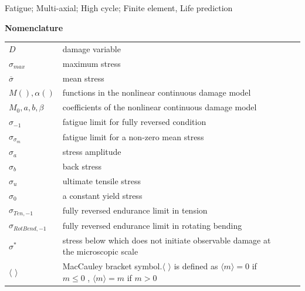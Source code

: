\documentclass[3p,times,procedia,number]{elsarticle}
\begin{document}
\begin{frontmatter}
\begin{keyword}
Fatigue; Multi-axial; High cycle; Finite element, Life prediction




\end{keyword}

\end{frontmatter}


\clearpage
\begin{flushleft}
	\textbf{Nomenclature}
	\vspace{6pt}
	\begin{table}[h]
		\begin{tabular}{lllll}
			$D$ & damage variable  &  &  &  \\
			$\sigma_{max}$ & maximum stress &  &  &  \\
			$\overline{\sigma}$ & mean stress &  &  &  \\
			$M(),\alpha()$& functions in the nonlinear continuous damage model &  &  &  \\
			$M_0,a,b,\beta$ & coefficients of the nonlinear continuous damage model &  &  &  \\
			$\sigma_{-1}$ & fatigue limit for fully reversed condition  &  &  &  \\
			$\sigma_{\sigma_m}$ & fatigue limit for a non-zero mean stress  &  &  &  \\
			$\sigma_{a}$ & stress amplitude &  &  &  \\
			$\sigma_{b}$ & back stress  &  &  &  \\
			$\sigma_{u}$ & ultimate tensile stress &  &  &  \\
			$\sigma_{0}$ & a constant yield stress &  &  &  \\
			$\sigma_{Ten,-1}$ & fully reversed endurance limit in tension &  &  &  \\
			$\sigma_{RotBend,-1}$ & fully reversed endurance limit in rotating bending &  &  &  \\
			$\sigma^*$ & stress below which does not initiate observable damage at the microscopic scale &  &  &  \\
			$\langle$ $\rangle$& MacCauley bracket symbol.$\langle$ $\rangle$ is defined as $\langle m\rangle=0$ if $m\leqslant0$ , $\langle m\rangle=m$ if $m>0$&  &  &  \\

\end{tabular}
\end{table}
\end{flushleft}
\end{document}
